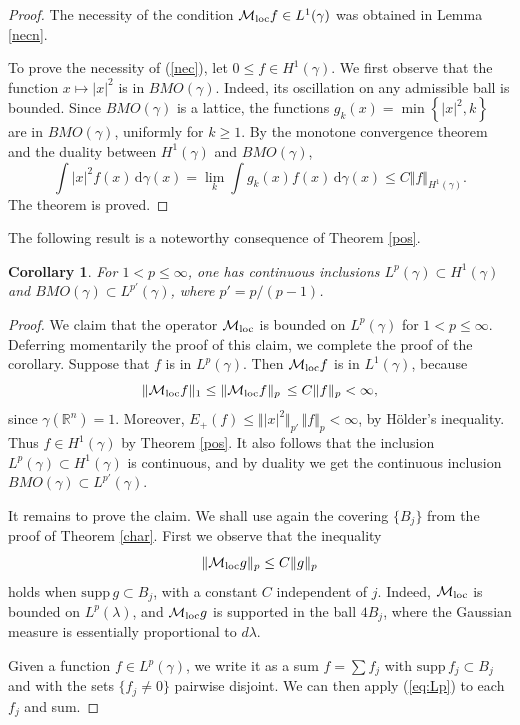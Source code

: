 \documentclass{amsart}                 %
\newtheorem{corollary}[theorem]{Corollary}
\numberwithin{equation}{section}
\newcommand\set[1]{{\left\{#1\right\}}}
\renewcommand\mod[1]{\left\vert{#1}\right\vert}
\newcommand\norm[2]{{\Vert{#1}\Vert_{#2}}}
\newcommand\wrt{\,\mathrm{d}}
\newcommand\1{{\bf 1}}
\newcommand\BR{\mathbb{R}} \newcommand\BRd{\mathbb{R}^d}
\newcommand\cM{\mathcal{M}}  \newcommand\fM{\mathfrak{M}}
\newcommand\mlo {\cM_{\textnormal{loc}}}
\newcommand\ga{\gamma}    \newcommand\Ga{\Gamma}
\newcommand\la{\lambda}   \newcommand\La{\Lambda}
\newcommand\huat[1]{H^1(#1)}
\newcommand\supp{\mathrm{supp}\,}
\begin{document}
\begin{proof}
The necessity of the condition $\mlo f\in L^1(\gamma)$   was obtained in
Lemma \ref{necn}. 

 To prove the necessity of (\ref{nec}), let   $0 \le f \in \huat{\gamma}$. 
We first observe
that the function $x\mapsto \mod{x}^2$ is in $BMO(\ga)$. Indeed, its
oscillation on any admissible ball is bounded. 
Since $BMO(\gamma)$ is a lattice, the 
functions $g_k(x)=\min\set{\mod{x}^2,k}$ are 
in $BMO(\gamma)$, uniformly for  $k \ge 1$.
  By the monotone convergence theorem and the 
duality between $\huat{\gamma}$ and $BMO(\gamma)$,
$$
\int \mod{x}^2 f(x)\wrt\gamma(x)=\lim_k \int g_k(x) f(x)\wrt\gamma(x)
\le C \norm{f}{\huat{\gamma}}.
$$
The theorem is proved.
\end{proof}

The following result is a noteworthy consequence of Theorem \ref{pos}.
\begin{corollary}\label{Lp}
For $1<p\le\infty$, one has  continuous inclusions $L^p(\gamma)
\subset\huat{\gamma}$ and $BMO(\gamma)\subset L^{p'}(\gamma)$, where
$p' = p/(p-1)$.
\end{corollary}
\begin{proof}
We claim that the operator $\mlo$ is bounded on $L^p(\gamma)$ for 
$1<p\le\infty$. Deferring momentarily the proof of this claim, we 
complete the proof of the corollary. Suppose that $f$ is in $L^p
(\gamma)$. Then $\mlo f$ is in $L^1(\gamma)$, because
$$
\norm{\mlo f}{1}\le \norm{\mlo f}{p}\, \le C \norm{f}{p}<\infty,
$$
since $\gamma(\BR^n)=1$. Moreover, $E_+(f)\le \norm{\mod{x}^2}{p'}\,
\norm{f}{p} < \infty$, by H\"older's inequality. Thus $f\in \huat{\gamma}$ by 
Theorem \ref{pos}. It also follows that the inclusion 
$L^p(\gamma)\subset \huat{\gamma}$ is 
continuous, and by duality we get the continuous inclusion  
$BMO(\gamma)\subset L^{p'}(\gamma)$.\par
It remains to prove the claim.
We shall use again the
covering $\{B_j\}$ from the proof of Theorem \ref{char}. 
First  we observe that the inequality
\begin{equation}  
\label{eq:Lp}
\norm{\mlo g}{p} \le C\norm{g}{p}
\end{equation}
holds when $\supp g \subset B_j$, with a constant $C$  independent of $j$. 
Indeed, $\mlo$ is bounded on $L^p(\la)$, and $\mlo g$ is supported in the  
ball $4B_j$, where the Gaussian
measure is essentially proportional to $d\la$.


 Given a function $f \in L^p(\ga)$, we write it 
as a sum $f = \sum f_j$ with  $\supp f_j \subset B_j$ and with the
sets $\{f_j \ne 0\}$ pairwise disjoint. We can then apply (\ref{eq:Lp})
to each $f_j$ and sum.
\end{proof}
\end{document}
